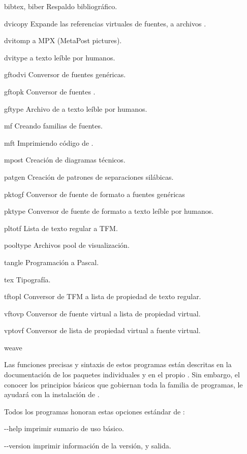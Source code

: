 \documentclass{article}
\begin{document}
\begin{cmddescription}
\item[bibtex, biber]   Respaldo bibliográfico.  
\item[dvicopy]   Expande las referencias virtuales de fuentes, a archivos
	\dvi{}.
\item[dvitomp]   \dvi{} a MPX (MetaPost pictures).
\item[dvitype]   \dvi{} a texto leíble por humanos.
\item[gftodvi]   Conversor de fuentes genéricas.
\item[gftopk]    Conversor de fuentes .
\item[gftype]    Archivo de  a texto leíble por humanos.
\item[mf]        Creando familias de fuentes.
\item[mft]       Imprimiendo código de \MF{}.
\item[mpost]     Creación de diagramas técnicos. 
\item[patgen]    Creación de patrones de separaciones silábicas.
\item[pktogf]    Conversor de fuente de formato  a fuentes genéricas
\item[pktype]    Conversor de fuente de formato  a texto leíble por
humanos. 
\item[pltotf]    Lista de texto regular a TFM. 
\item[pooltype]  Archivos pool \web{} de visualización. 
\item[tangle]    Programación \web{} a Pascal.
\item[tex]       Tipografía.
\item[tftopl]    Conversor de TFM a lista de propiedad de texto regular.
\item[vftovp]    Conversor de fuente virtual a lista de propiedad virtual. 
\item[vptovf]    Conversor de lista de propiedad virtual a fuente virtual.
\item[weave]     \web{} 
\end{cmddescription}

\noindent Las funciones precisas y sintaxis de estos
programas están descritas en la documentación de los
paquetes individuales y en el propio \Webc{}. Sin embargo,
el conocer los principios básicos que gobiernan toda la
familia de programas, le ayudará con la instalación de
\Webc{}. 

Todos los programas honoran estas opciones estándar de \GNU{}:
\begin{ttdescription}
	\item[-{}-help] imprimir sumario de uso básico. 
	\item[-{}-version] imprimir información de la versión, y
		salida.
\end{ttdescription}
\end{document}
